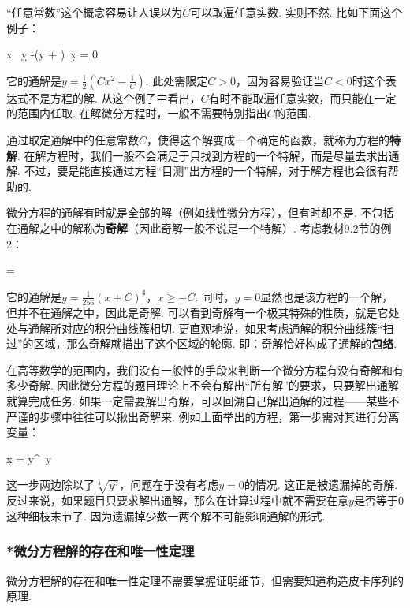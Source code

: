 “任意常数”这个概念容易让人误以为$C$可以取遍任意实数.
实则不然.
比如下面这个例子：
\begin{eq1}
    x ~\d y -(y  + )~\d x = 0
\end{eq1}

它的通解是$y = \frac{1}{2}(Cx^2 - \frac{1}{C})$.
此处需限定$C>0$，因为容易验证当$C<0$时这个表达式不是方程的解.
从这个例子中看出，$C$有时不能取遍任意实数，而只能在一定的范围内任取.
在解微分方程时，一般不需要特别指出$C$的范围.

通过取定通解中的任意常数$C$，使得这个解变成一个确定的函数，就称为方程的\textbf{特解}.
在解方程时，我们一般不会满足于只找到方程的一个特解，而是尽量去求出通解.
不过，要是能直接通过方程“目测”出方程的一个特解，对于解方程也会很有帮助的.

微分方程的通解有时就是全部的解（例如线性微分方程），但有时却不是.
不包括在通解之中的解称为\textbf{奇解}（因此奇解一般不说是一个特解）.
考虑教材9.2节的例2：
\begin{eq1}
     = 
\end{eq1}

它的通解是$y = \frac{1}{256}(x+C)^4$，$x \ge -C$.
同时，$y = 0$显然也是该方程的一个解，但并不在通解之中，因此是奇解.
可以看到奇解有一个极其特殊的性质，就是它处处与通解所对应的积分曲线簇相切.
更直观地说，如果考虑通解的积分曲线簇“扫过”的区域，那么奇解就描出了这个区域的轮廓.
即：奇解恰好构成了通解的\textbf{包络}.

在高等数学的范围内，我们没有一般性的手段来判断一个微分方程有没有奇解和有多少奇解.
因此微分方程的题目理论上不会有解出“所有解”的要求，只要解出通解就算完成任务.
如果一定需要解出奇解，可以回溯自己解出通解的过程——某些不严谨的步骤中往往可以揪出奇解来.
例如上面举出的方程，第一步需对其进行分离变量：
\begin{eq1}
    \d x = y^{}~\d y
\end{eq1}

这一步两边除以了$\sqrt[4]{y^3}$，问题在于没有考虑$y=0$的情况.
这正是被遗漏掉的奇解.
反过来说，如果题目只要求解出通解，那么在计算过程中就不需要在意$y$是否等于$0$这种细枝末节了.
因为遗漏掉少数一两个解不可能影响通解的形式.

\subsubsection{*微分方程解的存在和唯一性定理}\par

微分方程解的存在和唯一性定理不需要掌握证明细节，但需要知道构造皮卡序列的原理.

